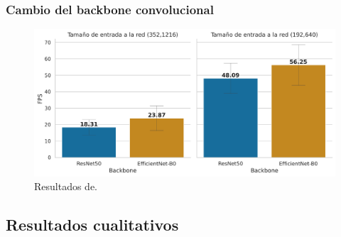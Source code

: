 \subsubsection{Cambio del backbone convolucional}


\begin{figure}[H]
\centering
\includegraphics[width=0.9\linewidth]{imagenes/Resultados/velocidad_inferencia_backbone.png} 
\captionsetup{width=.8\linewidth}
\caption{Resultados de.}
\label{fig:resultados-inf-backbone}
\end{figure}

\subsection{Resultados cualitativos}

